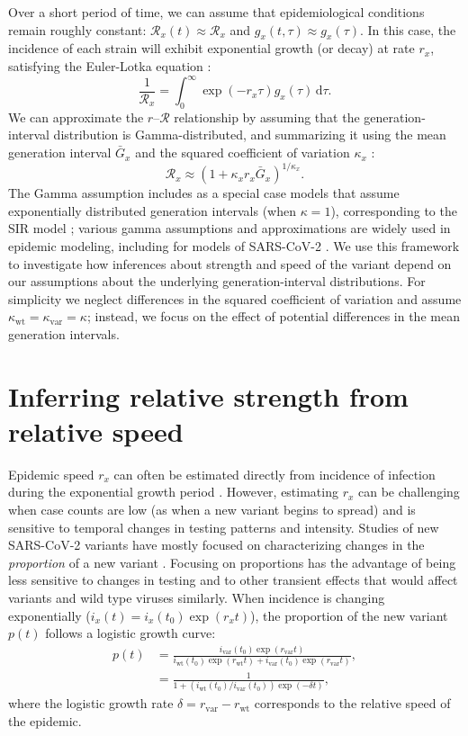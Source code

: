 \documentclass[12pt]{article}
\newcommand{\vvvar}{\mathrm{var}}
\newcommand{\wwwt}{\mathrm{wt}}
\newcommand{\rx}[1]{\ensuremath{{r}_{#1}}\xspace}
\newcommand{\rw}{\rx{\wwwt}}
\newcommand{\rv}{\rx{\vvvar}}
\newcommand{\RR}{\ensuremath{{\mathcal R}}\xspace}
\newcommand{\dd}[1]{\ensuremath{\, \mathrm{d}#1}}
\newcommand{\dtau}{\dd{\tau}}
\newcommand{\ix}[1]{\ensuremath{{i}_{#1}}\xspace}
\newcommand{\iw}{\ix{\wwwt}}
\newcommand{\iv}{\ix{\vvvar}}
\begin{document}
Over a short period of time, we can assume that epidemiological conditions remain roughly constant: $\RR_x(t) \approx \RR_x$ and $g_x(t, \tau) \approx g_x(\tau)$.
In this case, the incidence of each strain will exhibit exponential growth (or decay) at rate $r_x$, satisfying the Euler-Lotka equation \citep{wallinga2007generation}:
\begin{equation}
\frac{1}{\RR_x} = \int_0^\infty \exp(- r_x \tau) g_x(\tau) \dtau.
\end{equation}
We can approximate the $r$--$\RR$ relationship by assuming that the generation-interval distribution is Gamma-distributed, and summarizing it using the mean generation interval $\bar{G}_x$ and the squared coefficient of variation $\kappa_x$ \citep{park2019practical}:
\begin{equation}
\RR_x \approx (1 + \kappa_x r_x \bar{G}_x)^{1/\kappa_x}.
\end{equation}
The Gamma assumption includes as a special case models that assume exponentially distributed generation intervals (when $\kappa=1$), corresponding to the SIR model \citep{anderson1991infectious}; various gamma assumptions and approximations are widely used in epidemic modeling, including for models of SARS-CoV-2 \citep{doi:10.1098/rsif.2020.0144}.
We use this framework to investigate how inferences about strength and speed of the variant depend on our assumptions about the underlying generation-interval distributions.
For simplicity we neglect differences in the squared coefficient of variation and assume $\kappa_{\mathrm{wt}} = \kappa_{\mathrm{var}} = \kappa$; instead, we focus on the effect of potential differences in the mean generation intervals.

\section{Inferring relative strength from relative speed}

Epidemic speed $r_x$ can often be estimated directly from incidence of infection during the exponential growth period \citep{mills2004transmissibility,nishiura2009transmission,ma2014estimating}.
However, estimating $r_x$ can be challenging when case counts are low (as when a new variant begins to spread) and is sensitive to temporal changes in testing patterns and intensity.
Studies of new SARS-CoV-2 variants have mostly focused on characterizing changes in the \emph{proportion} of a new variant \citep{switzerland2021variant, davies2021estimated, di2021impact, leung2021early, volz2021transmission,zhao2021}.
Focusing on proportions has the advantage of being less sensitive to changes in testing and to other transient effects that would affect variants and wild type viruses similarly.
When incidence is changing exponentially ($i_x(t) = i_x(t_0) \exp(r_x t)$), the proportion of the new variant $p(t)$ follows a logistic growth curve:
\begin{align}
p(t) &= \frac{\iv(t_0) \exp(\rv t)}{\iw(t_0) \exp(\rw t) + \iv(t_0) \exp(\rv t)},
\\ &= \frac{1}{1 + \left(\iw(t_0)/\iv(t_0)\right) \exp(-\delta t)},
\end{align}
where the logistic growth rate $\delta = \rv - \rw$ corresponds to the relative speed of the epidemic.
\end{document}
